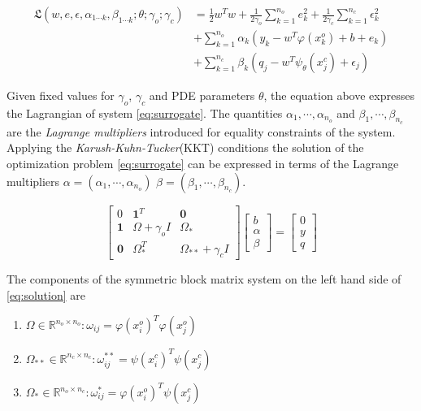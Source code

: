 \documentclass{article}
\begin{document}
\begin{align*}\label{eq:lag}
      \mathfrak{L}(w,e,\epsilon, \alpha_{1 \cdots k}, \beta_{1 \cdots k}; \theta; \gamma_{o}; \gamma_{c}) &= 
      \frac{1}{2} w^{T}w + \frac{1}{2\gamma_{o}} \sum_{k = 1}^{n_{o}}{e^{2}_{k}} +
      \frac{1}{2\gamma_{c}} \sum_{k = 1}^{n_{c}}{\epsilon^{2}_{k}} \\
      & + \sum_{k = 1}^{n_{o}}{\alpha_{k}(y_{k} - w^{T}\varphi(x^{o}_{k}) + b + e_{k})} \\
      & + \sum_{k = 1}^{n_{c}}{\beta_{k}(q_{j} - w^{T}\psi_{\theta}(x^{c}_{j}) + \epsilon_{j})} 
\end{align*}

Given fixed values for $\gamma_{o}$, $\gamma_{c}$ and PDE parameters
$\theta$, the equation above expresses the Lagrangian of system
\ref{eq:surrogate}. The quantities $\alpha_{1}, \cdots, \alpha_{n_{o}}$ and
$\beta_{1}, \cdots, \beta_{n_{c}}$ are the \emph{Lagrange multipliers}
introduced for equality constraints of the system. Applying the
\emph{Karush-Kuhn-Tucker}(KKT) conditions the solution of the
optimization problem \ref{eq:surrogate} can be expressed in terms of
the Lagrange multipliers $\alpha = (\alpha_{1}, \cdots, \alpha_{n_{o}})$
$\beta = (\beta_{1}, \cdots, \beta_{n_{c}})$.

\begin{equation}\label{eq:solution}
  \begin{bmatrix}
    0 & \mathbf{1}^{T} & \mathbf{0} \\ 
    \mathbf{1} & \Omega + \gamma_{o}I  & \Omega_*\\ 
    \mathbf{0} & \Omega_{*}^{T}  & \Omega_{**} + \gamma_{c}I 
  \end{bmatrix} \begin{bmatrix}
    b\\ 
    \alpha\\ 
    \beta
  \end{bmatrix} = \begin{bmatrix}
    0\\ 
    y\\ 
    q
  \end{bmatrix}
\end{equation}

The components of the symmetric block matrix system on the left hand side of 
\ref{eq:solution} are 
\begin{enumerate}
\item $\Omega \in \mathbb{R}^{n_{o} \times n_{o}}: \omega_{ij} = \varphi(x^{o}_{i})^{T} \varphi(x^{o}_{j})$
\item $\Omega_{**} \in \mathbb{R}^{n_{c} \times n_{c}}: \omega^{**}_{ij} = \psi(x^{c}_{i})^{T} \psi(x^{c}_{j})$
\item $\Omega_{*} \in \mathbb{R}^{n_{o} \times n_{c}}: \omega^{*}_{ij} = \varphi(x^{o}_{i})^{T} \psi(x^{c}_{j})$
\end{enumerate}
\end{document}
